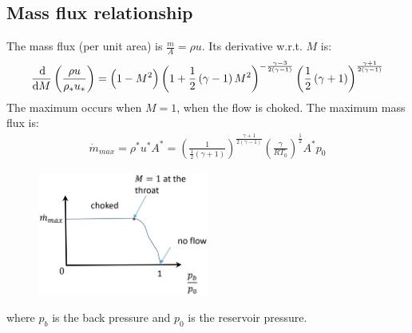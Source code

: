 \documentclass[class=report, crop=false, 12pt,a4paper]{standalone}
\begin{document}
\subsection{Mass flux relationship}
The mass flux (per unit area) is $\frac{m}{A} = \rho u$. Its derivative w.r.t. $M$ is:
\begin{gather}
    \frac{\dif}{\dif M}\left(\frac{\rho u}{\rho_* u_*}\right) = \left(1-M^2\right)\left(1 + \frac{1}{2}\left(\gamma - 1\right)M^2\right)^{-\frac{\gamma -3}{2\left(\gamma - 1\right)}}\left(\frac{1}{2}\left(\gamma + 1\right)\right)^{\frac{\gamma + 1}{2\left(\gamma -1\right)}}
\end{gather}
The maximum occurs when $M=1$, when the flow is choked. The maximum mass flux is:
\begin{gather}
    \dot{m}_{max} = \rho^* u^* A^* = \left(\frac{1}{\frac{1}{2}\left(\gamma + 1\right)}\right)^{\frac{\gamma + 1}{2\left(\gamma -1\right)}}\left(\frac{\gamma}{RT_0}\right)^{\frac{1}{2}}A^* p_0
\end{gather}
\begin{figure}[H]
    \centering
    \includegraphics[width = 0.5\textwidth]{../img/diagram55.png}
    \caption{}
\end{figure}
where $p_b$ is the back pressure and $p_0$ is the reservoir pressure.
\end{document}
